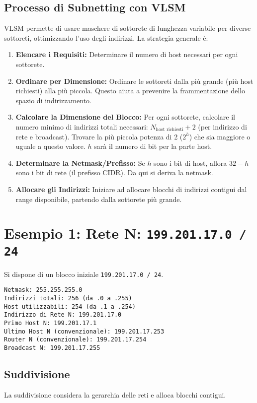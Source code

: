 \documentclass{article}
\begin{document}
\subsection{Processo di Subnetting con VLSM}
VLSM permette di usare maschere di sottorete di lunghezza variabile per diverse sottoreti, ottimizzando l'uso degli indirizzi. La strategia generale è:
\begin{enumerate}
    \item \textbf{Elencare i Requisiti:} Determinare il numero di host necessari per ogni sottorete.
    \item \textbf{Ordinare per Dimensione:} Ordinare le sottoreti dalla più grande (più host richiesti) alla più piccola. Questo aiuta a prevenire la frammentazione dello spazio di indirizzamento.
    \item \textbf{Calcolare la Dimensione del Blocco:} Per ogni sottorete, calcolare il numero minimo di indirizzi totali necessari: $N_{\text{host richiesti}} + 2$ (per indirizzo di rete e broadcast). Trovare la più piccola potenza di 2 ($2^h$) che sia maggiore o uguale a questo valore. $h$ sarà il numero di bit per la parte host.
    \item \textbf{Determinare la Netmask/Prefisso:} Se $h$ sono i bit di host, allora $32 - h$ sono i bit di rete (il prefisso CIDR). Da qui si deriva la netmask.
    \item \textbf{Allocare gli Indirizzi:} Iniziare ad allocare blocchi di indirizzi contigui dal range disponibile, partendo dalla sottorete più grande.
\end{enumerate}

\newpage
\section{Esempio 1: Rete N: \texttt{199.201.17.0 / 24}}
Si dispone di un blocco iniziale \texttt{199.201.17.0 / 24}.
\begin{verbatim}
Netmask: 255.255.255.0
Indirizzi totali: 256 (da .0 a .255)
Host utilizzabili: 254 (da .1 a .254)
Indirizzo di Rete N: 199.201.17.0
Primo Host N: 199.201.17.1
Ultimo Host N (convenzionale): 199.201.17.253
Router N (convenzionale): 199.201.17.254
Broadcast N: 199.201.17.255
\end{verbatim}

\subsection{Suddivisione}
La suddivisione considera la gerarchia delle reti e alloca blocchi contigui.
\end{document}
